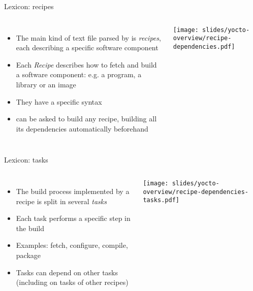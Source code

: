 \begin{frame}{Lexicon: recipes}
  \begin{columns}
    \begin{itemize}
      \item The main kind of text file parsed by  is {\em recipes},
        each describing a specific software component
      \item Each {\em Recipe} describes how to fetch and build a software
        component: e.g. a program, a library or an image
      \item They have a specific syntax
      \item {} can be asked to build any recipe, building all its
        dependencies automatically beforehand
    \end{itemize}
    \begin{center}
      \texttt{[image: slides/yocto-overview/recipe-dependencies.pdf]}
    \end{center}
  \end{columns}
\end{frame}

\begin{frame}{Lexicon: tasks}
  \begin{columns}
    \begin{itemize}
      \item The build process implemented by a recipe is split in several
        {\em tasks}
      \item Each task performs a specific step in the build
      \item Examples: fetch, configure, compile, package
      \item Tasks can depend on other tasks (including on tasks of other
        recipes)
    \end{itemize}
    \begin{center}
      \texttt{[image: slides/yocto-overview/recipe-dependencies-tasks.pdf]}
    \end{center}
  \end{columns}
\end{frame}

